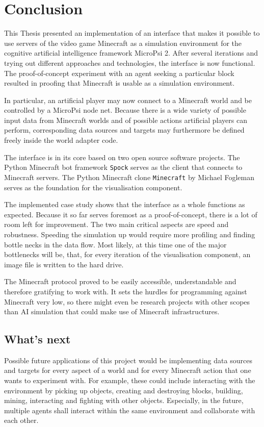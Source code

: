 \chapter{Conclusion}
This Thesis presented an implementation of an interface that makes it possible to use servers of the video game Minecraft as a simulation environment for the cognitive artificial intelligence framework MicroPsi 2. After several iterations and trying out different approaches and technologies, the interface is now functional. The proof-of-concept experiment with an agent seeking a particular block resulted in proofing that Minecraft is usable as a simulation environment.

In particular, an artificial player may now connect to a Minecraft world and be controlled by a MicroPsi node net. Because there is a wide variety of possible input data from Minecraft worlds and of possible actions artificial players can perform, corresponding data sources and targets may furthermore be defined freely inside the world adapter code.

The interface is in its core based on two open source software projects. The Python Minecraft bot framework \texttt{Spock} serves as the client that connects to Minecraft servers. The Python Minecraft clone \texttt{Minecraft} by Michael Fogleman serves as the foundation for the visualisation component.

The implemented case study shows that the interface as a whole functions as expected. Because it so far serves foremost as a proof-of-concept, there is a lot of room left for improvement. The two main critical aspects are speed and robustness. Speeding the simulation up would require more profiling and finding bottle necks in the data flow. Most likely, at this time one of the major bottlenecks will be, that, for every iteration of the visualisation component, an image file is written to the hard drive.

The Minecraft protocol proved to be easily accessible, understandable and therefore gratifying to work with. It sets the hurdles for programming against Minecraft very low, so there might even be research projects with other scopes than AI simulation that could make use of Minecraft infrastructures.

\section{What's next}
Possible future applications of this project would be implementing data sources and targets for every aspect of a world and for every Minecraft action that one wants to experiment with. For example, these could include interacting with the environment by picking up objects, creating and destroying blocks, building, mining, interacting and fighting with other objects. Especially, in the future, multiple agents shall interact within the same environment and collaborate with each other.